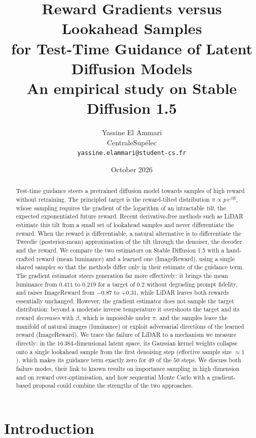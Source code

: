 \documentclass[11pt]{article}
\title{\textbf{Reward Gradients versus Lookahead Samples\\for Test-Time Guidance of Latent Diffusion Models}\\[0.4em]
\large An empirical study on Stable Diffusion 1.5}
\author{Yassine El Ammari\\
\small CentraleSup\'elec\\
\small \texttt{yassine.elammari@student-cs.fr}}
\date{October 2026}
\begin{document}
\maketitle

\begin{abstract}
Test-time guidance steers a pretrained diffusion model towards samples of high reward without retraining. The principled target is the reward-tilted distribution $\pi \propto p\,e^{\beta R}$, whose sampling requires the gradient of the logarithm of an intractable \emph{tilt}, the expected exponentiated future reward. Recent derivative-free methods such as LiDAR estimate this tilt from a small set of lookahead samples and never differentiate the reward. When the reward is differentiable, a natural alternative is to differentiate the Tweedie (posterior-mean) approximation of the tilt through the denoiser, the decoder and the reward. We compare the two estimators on Stable Diffusion 1.5 with a hand-crafted reward (mean luminance) and a learned one (ImageReward), using a single shared sampler so that the methods differ only in their estimate of the guidance term. The gradient estimator steers generation far more effectively: it brings the mean luminance from $0.411$ to $0.219$ for a target of $0.2$ without degrading prompt fidelity, and raises ImageReward from $-0.87$ to $+0.31$, while LiDAR leaves both rewards essentially unchanged. However, the gradient estimator does not sample the target distribution: beyond a moderate inverse temperature it overshoots the target and its reward \emph{decreases} with $\beta$, which is impossible under $\pi$, and the samples leave the manifold of natural images (luminance) or exploit adversarial directions of the learned reward (ImageReward). We trace the failure of LiDAR to a mechanism we measure directly: in the $16\,384$-dimensional latent space, its Gaussian kernel weights collapse onto a single lookahead sample from the first denoising step (effective sample size $\approx 1$), which makes its guidance term exactly zero for $49$ of the $50$ steps. We discuss both failure modes, their link to known results on importance sampling in high dimension and on reward over-optimisation, and how sequential Monte Carlo with a gradient-based proposal could combine the strengths of the two approaches.
\end{abstract}

\section{Introduction}
\label{sec:intro}
\end{document}
